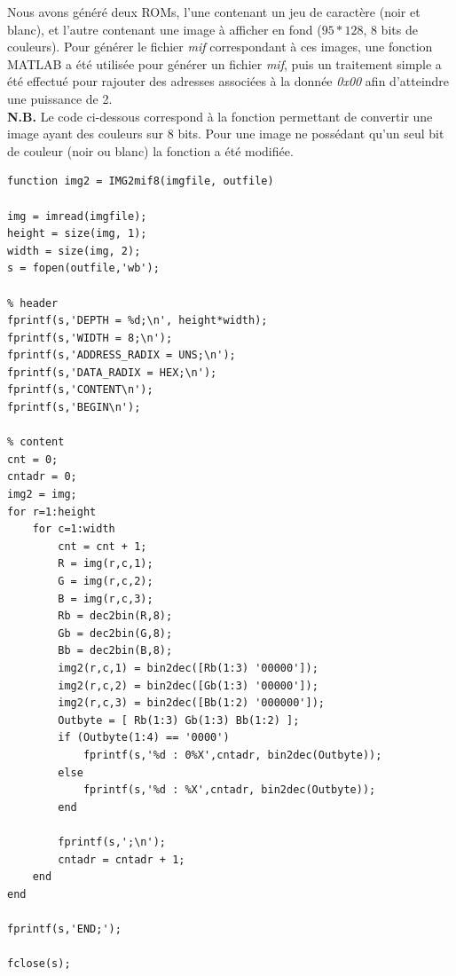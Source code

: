 Nous avons généré deux ROMs, l'une contenant un jeu de caractère (noir et blanc), et l'autre contenant une image à afficher en fond ($95*128$, 8 bits de couleurs). Pour générer le fichier \emph{mif} correspondant à ces images, une fonction MATLAB \cite{cite:rommatlab} a été utilisée pour générer un fichier \emph{mif}, puis un traitement simple a été effectué pour rajouter des adresses associées à la donnée \emph{0x00} afin d'atteindre une puissance de 2.\\

\noindent \textbf{N.B.} Le code ci-dessous correspond à la fonction permettant de convertir une image ayant des couleurs sur 8 bits. Pour une image ne possédant qu'un seul bit de couleur (noir ou blanc) la fonction a été modifiée.\\

\begin{lstlisting}
function img2 = IMG2mif8(imgfile, outfile)

img = imread(imgfile);
height = size(img, 1);
width = size(img, 2);
s = fopen(outfile,'wb');

% header
fprintf(s,'DEPTH = %d;\n', height*width);
fprintf(s,'WIDTH = 8;\n');
fprintf(s,'ADDRESS_RADIX = UNS;\n');
fprintf(s,'DATA_RADIX = HEX;\n');
fprintf(s,'CONTENT\n');
fprintf(s,'BEGIN\n');

% content
cnt = 0;
cntadr = 0;
img2 = img;
for r=1:height
    for c=1:width
        cnt = cnt + 1;
        R = img(r,c,1);
        G = img(r,c,2);
        B = img(r,c,3);
        Rb = dec2bin(R,8);
        Gb = dec2bin(G,8);
        Bb = dec2bin(B,8);
        img2(r,c,1) = bin2dec([Rb(1:3) '00000']);
        img2(r,c,2) = bin2dec([Gb(1:3) '00000']);
        img2(r,c,3) = bin2dec([Bb(1:2) '000000']);
        Outbyte = [ Rb(1:3) Gb(1:3) Bb(1:2) ];
        if (Outbyte(1:4) == '0000')
            fprintf(s,'%d : 0%X',cntadr, bin2dec(Outbyte));
        else
            fprintf(s,'%d : %X',cntadr, bin2dec(Outbyte));
        end
        
        fprintf(s,';\n');
        cntadr = cntadr + 1;
    end
end

fprintf(s,'END;');

fclose(s);
\end{lstlisting}

